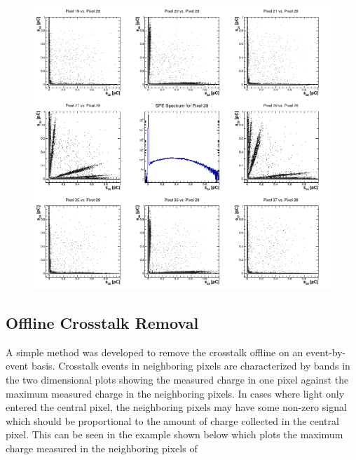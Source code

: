 \begin{figure}
	\includegraphics[width=0.95\linewidth]{figures/CA7709_neighbors_crosstalk.png}
	\caption{}
	\label{fig:H8500neighbors}
\end{figure}


\subsection{Offline Crosstalk Removal}

A simple method was developed to remove the crosstalk offline on an event-by-event basis. Crosstalk events in neighboring pixels are characterized by bands in the two dimensional plots showing the measured charge in one pixel against the maximum measured charge in the neighboring pixels. In cases where light only entered the central pixel, the neighboring pixels may have some non-zero signal which should be proportional to the amount of charge collected in the central pixel. This can be seen in the example shown below which plots the maximum charge measured in the neighboring pixels of 
